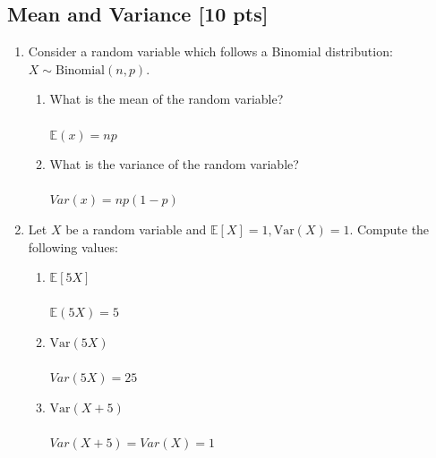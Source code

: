 \documentclass[a4paper]{article}
\theoremstyle{definition}
\newcommand{\Var}{\mathrm{Var}}
\newenvironment{soln}{
	\leavevmode\color{blue}\ignorespaces
}{}
\begin{document}
	\subsection{Mean and Variance [10 pts]}
	\begin{enumerate}
		\item Consider a random variable which follows a Binomial
		distribution: $X \sim \text{Binomial}(n, p)$.
		\begin{enumerate}
			\item What is the mean of the random variable?\\
			\begin{soln}\\
			$\mathbb{E}(x) = np$
			\end{soln}
			\item What is the variance of the random variable?\\
			\begin{soln}  \\
				$Var(x) = np(1-p)$
			\end{soln}
		\end{enumerate}
		
		\item Let $X$ be a random variable and
		$\mathbb{E}[X] = 1, \Var(X) = 1$. Compute the following values:
		\begin{enumerate}
			\item $\mathbb{E}[5X]$\\
			\begin{soln}\\
			$\mathbb{E}(5X) = 5$
			\end{soln}
			\item $\Var(5X)$\\
			\begin{soln}\\
			$Var(5X) = 25$
			\end{soln}
			\item $\Var(X+5)$\\
			\begin{soln}\\
			$Var(X+5) = Var(X) = 1$
			\end{soln}
		\end{enumerate}
	\end{enumerate}
	
	
\end{document}
